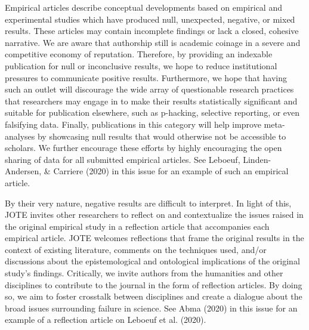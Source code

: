 \documentclass[twocolumn, serif]{jote-article}
\begin{document}
{{{{{{{Empirical articles describe conceptual developments based on empirical and experimental studies which have produced null, unexpected, negative, or mixed results. These articles may contain incomplete findings or lack a closed, cohesive narrative. We are aware that authorship still is academic coinage in a severe and competitive economy of reputation.
Therefore, by providing an indexable publication for null or inconclusive results, we hope to reduce institutional pressures to communicate positive results. Furthermore, we hope that having such an outlet will discourage the wide array of questionable research practices that researchers may engage in to make their results statistically significant and suitable for publication elsewhere, such as p-hacking, selective reporting, or even falsifying data. Finally, publications in this category will help improve meta-analyses by showcasing null results that would otherwise not be accessible to scholars. We further encourage these efforts by highly encouraging the open sharing of data for all submitted empirical articles. See Leboeuf, Linden-Andersen, \& Carriere (2020) in this issue for an example of such an empirical article.

\hypertarget{reflection-articles}{%

By their very nature, negative results are difficult to interpret. In light of this, JOTE invites other researchers to reflect on and contextualize the issues raised in the original empirical study in a reflection article that accompanies each empirical article. JOTE welcomes reflections that frame the original results in the context of existing literature, comments on the techniques used, and/or discussions about the epistemological and ontological implications of the original study's findings. Critically, we invite authors from the humanities and other disciplines to contribute to the journal in the form of reflection articles. By doing so, we aim to foster crosstalk between disciplines and create a dialogue about the broad issues surrounding failure in science. See Abma (2020) in this issue for an example of a reflection article on Leboeuf et al. (2020).

\hypertarget{meta-research-articles}{%

}}}}}}}}}
\end{document}
